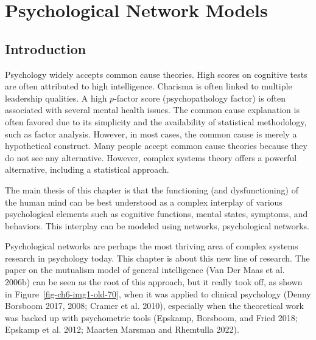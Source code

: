 \documentclass[
  a4paper,
  DIV=11,
  numbers=noendperiod]{scrreprt}
\begin{document}

\hypertarget{sec-ch6}{%
\chapter{Psychological Network Models}\label{sec-ch6}}

\hypertarget{sec-Introduction}{%
\section{Introduction}\label{sec-Introduction}}

Psychology widely accepts common cause theories. High scores on
cognitive tests are often attributed to high intelligence. Charisma is
often linked to multiple leadership qualities. A high \(p\)-factor score
(psychopathology factor) is often associated with several mental health
issues. The common cause explanation is often favored due to its
simplicity and the availability of statistical methodology, such as
factor analysis. However, in most cases, the common cause is merely a
hypothetical construct. Many people accept common cause theories because
they do not see any alternative. However, complex systems theory offers
a powerful alternative, including a statistical approach.

The main thesis of this chapter is that the functioning (and
dysfunctioning) of the human mind can be best understood as a complex
interplay of various psychological elements such as cognitive functions,
mental states, symptoms, and behaviors. This interplay can be modeled
using networks, psychological networks.

Psychological networks are perhaps the most thriving area of complex
systems research in psychology today. This chapter is about this new
line of research. The paper on the mutualism model of general
intelligence (Van Der Maas et al. 2006b) can be seen as the root of this
approach, but it really took off, as shown in
Figure~\ref{fig-ch6-img1-old-70}, when it was applied to clinical
psychology (Denny Borsboom 2017, 2008; Cramer et al. 2010), especially
when the theoretical work was backed up with psychometric tools
(Epskamp, Borsboom, and Fried 2018; Epskamp et al. 2012; Maarten Marsman
and Rhemtulla 2022).
\end{document}
